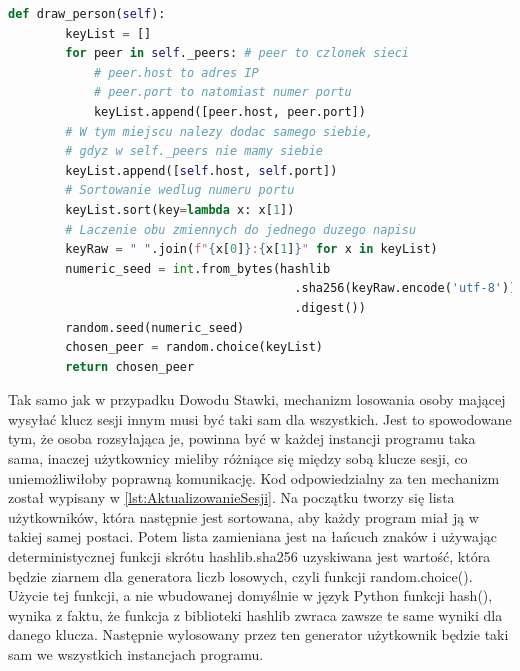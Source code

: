 \begin{lstlisting}[language=Python, extendedchars=true, caption={Wybieranie osoby}, label={lst:WybieranieOsoby}]
    def draw_person(self):
        keyList = []
        for peer in self._peers: # peer to czlonek sieci
            # peer.host to adres IP
            # peer.port to natomiast numer portu
            keyList.append([peer.host, peer.port])
        # W tym miejscu nalezy dodac samego siebie,
        # gdyz w self._peers nie mamy siebie
        keyList.append([self.host, self.port])
        # Sortowanie wedlug numeru portu
        keyList.sort(key=lambda x: x[1])
        # Laczenie obu zmiennych do jednego duzego napisu
        keyRaw = " ".join(f"{x[0]}:{x[1]}" for x in keyList)
        numeric_seed = int.from_bytes(hashlib
                                        .sha256(keyRaw.encode('utf-8'))
                                        .digest())
        random.seed(numeric_seed)
        chosen_peer = random.choice(keyList)
        return chosen_peer
\end{lstlisting}

Tak samo jak w przypadku Dowodu Stawki, mechanizm losowania osoby mającej wysyłać klucz sesji innym musi być taki sam dla wszystkich. Jest to spowodowane tym, że osoba rozsyłająca je, powinna być w każdej instancji programu taka sama, inaczej użytkownicy mieliby różniące się między sobą klucze sesji, co uniemożliwiłoby poprawną komunikację. Kod odpowiedzialny za ten mechanizm został wypisany w \lstlistingname{ \ref{lst:AktualizowanieSesji}}. Na początku tworzy się lista użytkowników, która następnie jest sortowana, aby każdy program miał ją w takiej samej postaci. Potem lista zamieniana jest na łańcuch znaków i używając deterministycznej funkcji skrótu hashlib.sha256 uzyskiwana jest wartość, która będzie ziarnem dla generatora liczb losowych, czyli funkcji random.choice(). Użycie tej funkcji, a nie wbudowanej domyślnie w język Python funkcji hash(), wynika z faktu, że funkcja z biblioteki hashlib zwraca zawsze te same wyniki dla danego klucza. Następnie wylosowany przez ten generator użytkownik będzie taki sam we wszystkich instancjach programu.

